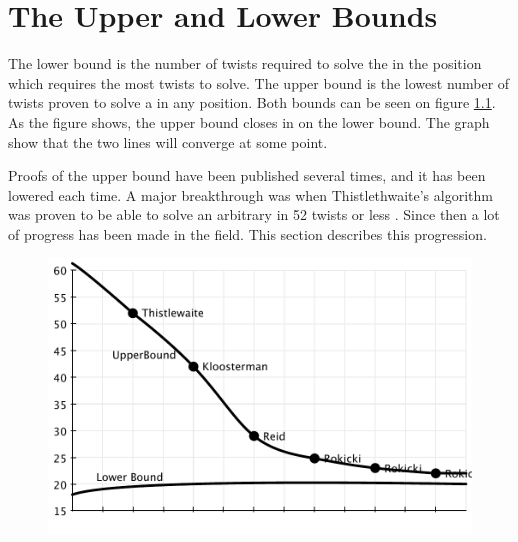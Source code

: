 \chapter{The Upper and Lower Bounds}

The lower bound is the number of twists required to solve the \rubik{} in the position which requires the most twists to solve.
The upper bound is the lowest number of twists proven to solve a \rubik{} in any position.
Both bounds can be seen on figure \ref{fig:upperLowerBound}.
As the figure shows, the upper bound closes in on the lower bound.
The graph show that the two lines will converge at some point.

Proofs of the upper bound have been published several times, and it has been lowered each time.
A major breakthrough was when Thistlethwaite's algorithm was proven to be able to solve an arbitrary \rubik{} in 52 twists or less \cite{jaapthistle}.
Since then a lot of progress has been made in the field.
This section describes this progression.

\begin{figure}[ht]
	\centering
		\includegraphics[scale = 0.7]{input/pics/bounds.pdf}
	\caption{}
	\label{fig:upperLowerBound}
\end{figure}




